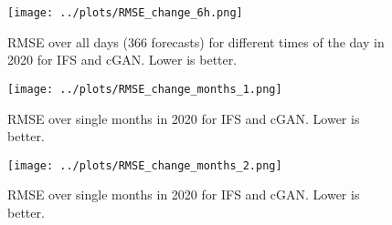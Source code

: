 \documentclass[12pt]{article}
\begin{document}
\begin{figure}
\begin{center}
\texttt{[image: ../plots/RMSE\_change\_6h.png]}
\end{center}
\caption{RMSE over all days (366 forecasts) for different times of the day in 2020 for IFS and cGAN. Lower is better.}
\end{figure}


\begin{figure}
\begin{center}
\texttt{[image: ../plots/RMSE\_change\_months\_1.png]}
\end{center}
\caption{RMSE over single months in 2020 for IFS and cGAN. Lower is better.}
\end{figure}

\begin{figure}
\begin{center}
\texttt{[image: ../plots/RMSE\_change\_months\_2.png]}
\end{center}
\caption{RMSE over single months in 2020 for IFS and cGAN. Lower is better.}
\end{figure}
\end{document}
